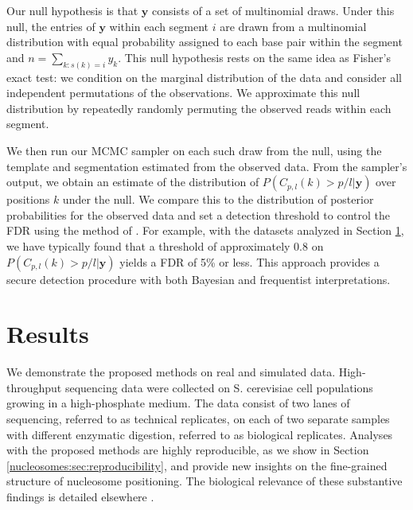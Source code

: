 Our null hypothesis is that $\bm y$ consists of a set of multinomial draws.
Under this null, the entries of $\bm y$ within each segment $i$ are drawn from a multinomial distribution with equal probability assigned to each base pair within the segment and $n = \sum_{k : s(k) = i} y_{k}$.
This null hypothesis rests on the same idea as Fisher's exact test: we condition on the marginal distribution of the data and consider all independent permutations of the observations. 
We approximate this null distribution by repeatedly randomly permuting the observed reads within each segment.

We then run our MCMC sampler on each such draw from the null, using the template and segmentation estimated from the observed data.
From the sampler's output, we obtain an estimate of the distribution of $P(C_{p,l}(k) > p / l | \bm y)$ over positions $k$ under the null.
We compare this to the distribution of posterior probabilities for the observed data and set a detection threshold to control the FDR using the method of \citet{StoreyTibshirani2003}.
For example, with the datasets analyzed in Section \ref{nucleosomes:sec:results}, we have typically found that a threshold of approximately $0.8$ on $P(C_{p,l}(k) > p / l | \bm y)$ yields a FDR of 5\% or less.
This approach provides a secure detection procedure with both Bayesian and frequentist interpretations.


\section{Results}
\label{nucleosomes:sec:results}

We demonstrate the proposed methods on  real and simulated data.
%
High-throughput sequencing data were collected on S. cerevisiae cell populations growing in a high-phosphate medium.
The data consist of two lanes of sequencing, referred to as technical replicates, on each of two separate samples with different enzymatic digestion, referred to as biological replicates.
Analyses with the proposed methods are highly reproducible, as we show in Section \ref{nucleosomes:sec:reproducibility}, and provide new insights on the fine-grained structure of nucleosome positioning.
The biological relevance of these substantive findings is detailed elsewhere \citep{Xu:Alex:Edo:Erin:2011}.

